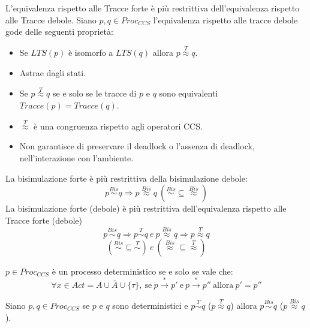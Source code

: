L'equivalenza rispetto alle Tracce forte è più restrittiva dell'equivalenza
rispetto alle Tracce debole. Siano $p, q \in Proc_{CCS}$ l'equivalenza rispetto
alle tracce debole gode delle seguenti proprietà:
\begin{itemize}
    \item Se $LTS(p)$ è isomorfo a $LTS(q)$ allora $p \stackrel{T}{\approx} q$.
    \item Astrae dagli stati.
    \item Se $p \stackrel{T}{\approx} q$ se e solo se le tracce di $p$ e $q$ sono
          equivalenti $Tracce(p) = Tracce(q)$.
    \item $\stackrel{T}{\approx}$ è una congruenza rispetto agli operatori CCS.
    \item Non garantisce di preservare il deadlock o l'assenza di deadlock,
          nell'interazione con l'ambiente.
\end{itemize}
La bisimulazione forte è più restrittiva della bisimulazione debole:
\begin{equation}
    p \stackrel{Bis}{\sim} q \Rightarrow p \stackrel{Bis}{\approx} q
    \ (\stackrel{Bis}{\sim} \subseteq \stackrel{Bis}{\approx})
\end{equation}
La bisimulazione forte (debole) è più restrittiva dell'equivalenza rispetto alle
Tracce forte (debole)
\begin{equation}
    p \stackrel{Bis}{\sim} q \Rightarrow p \stackrel{T}{\sim} q \ e
    \ p \stackrel{Bis}{\approx} q \Rightarrow p \stackrel{T}{\approx} q
\end{equation}
\begin{equation}
    (\stackrel{Bis}{\sim} \subseteq \stackrel{T}{\sim}) \ e \
    (\stackrel{Bis}{\approx} \subseteq \stackrel{T}{\approx})
\end{equation}
\begin{definizione}
    $p \in Proc_{CCS}$ è un processo deterministico se e solo se vale che:
    \begin{equation}
        \forall x \in Act = A \cup \overline{A} \cup \{\tau\}, \ \text{se} \ p
        \xrightarrow{\ast} p' \ \text{e} \ p \xrightarrow{\ast} p'' \ \text{allora} \ p' = p''
    \end{equation}
\end{definizione}
Siano $p, q \in Proc_{CCS}$ se $p$ e $q$ sono deterministici e
$p \stackrel{T}{\sim} q$ ($p \stackrel{T}{\approx} q$) allora
$p \stackrel{Bis}{\sim} q$ ($p \stackrel{Bis}{\approx} q$).

